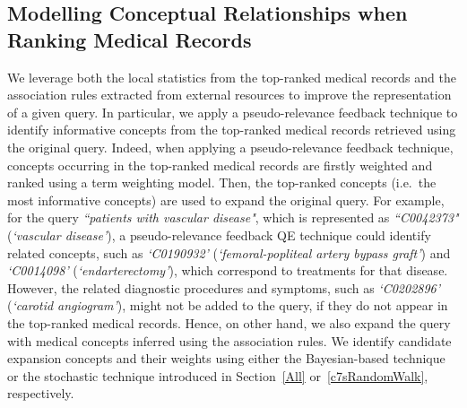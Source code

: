 \documentclass[1p]{elsarticle}
\begin{document}
\subsection{Modelling Conceptual Relationships when Ranking Medical Records}\label{c7sModel}
We leverage both the local statistics from the top-ranked medical records and the association rules extracted from external resources to improve the representation of a given query. 
In particular, we apply a pseudo-relevance feedback technique to identify informative concepts from the top-ranked medical records retrieved using the original query. 
Indeed, when applying a pseudo-relevance feedback technique, concepts occurring in the top-ranked medical records are firstly weighted and ranked using a term weighting model. Then, the top-ranked concepts (i.e.\ the most informative concepts) are used to expand the original query. 
For example, for the query \emph{``patients with vascular disease"}, which is represented as \emph{``C0042373"} (\emph{`vascular disease'}), a pseudo-relevance feedback QE technique could identify related concepts, such as \emph{`C0190932'} (\emph{`femoral-popliteal artery bypass graft'}) and \emph{`C0014098'} (\emph{`endarterectomy'}), which correspond to treatments for that disease. However, the related diagnostic procedures and symptoms, such as \emph{`C0202896'} (\emph{`carotid angiogram'}), might not be added to the query, if they do not appear in the top-ranked medical records. 
Hence, on other hand, we also expand the query with medical concepts inferred using the association rules. We identify candidate expansion concepts and their weights using either the Bayesian-based technique or the stochastic technique introduced in Section~\ref{All} or~\ref{c7sRandomWalk}, respectively.
\end{document}
